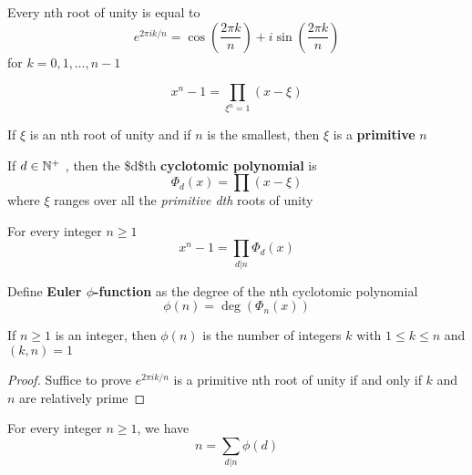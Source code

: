 \documentclass[11pt]{article}
\begin{document}
\begin{corollary}[]
Every nth root of unity is equal to
\begin{equation*}
e^{2\pi ik/n}=\cos(\frac{2\pi k}{n})+i\sin(\frac{2\pi k}{n})
\end{equation*}
for \(k=0,1,\dots,n-1\)
\end{corollary}

\begin{equation*}
x^n-1=\displaystyle\prod_{\xi^n=1}(x-\xi)
\end{equation*}

If \(\xi\) is an nth root of unity and if \(n\) is the smallest, then \(\xi\) is a
\textbf{primitive} \(n\)

\begin{definition}[]
If \(d\in\mathbb{N}^+\) , then the \$d\$th \textbf{cyclotomic polynomial} is 
\begin{equation*}
\Phi_d(x)=\displaystyle\prod(x-\xi)
\end{equation*}
where \(\xi\) ranges over all the \emph{primitive dth} roots of unity
\end{definition}

\begin{proposition}[]
For every integer \(n\ge 1\)
\begin{equation*}
x^n-1=\displaystyle\prod_{d|n}\Phi_d(x)
\end{equation*}
\end{proposition}

\begin{definition}[]
Define \textbf{Euler \(\phi\)-function} as the degree of the nth cyclotomic
polynomial
\begin{equation*}
\phi(n)=\deg(\Phi_n(x))
\end{equation*}
\end{definition}

\begin{proposition}[]
If \(n\ge1\) is an integer, then \(\phi(n)\) is the number of integers \(k\) with
\(1\le k\le n\) and \((k,n)=1\)
\end{proposition}

\begin{proof}
Suffice to prove \(e^{2\pi ik/n}\) is a primitive nth root of unity if and only
if \(k\) and \(n\) are relatively prime
\end{proof}

\begin{corollary}[]
For every integer \(n\ge 1\), we have
\begin{equation*}
n=\displaystyle\sum_{d|n}\phi(d)
\end{equation*}
\end{corollary}
\end{document}
